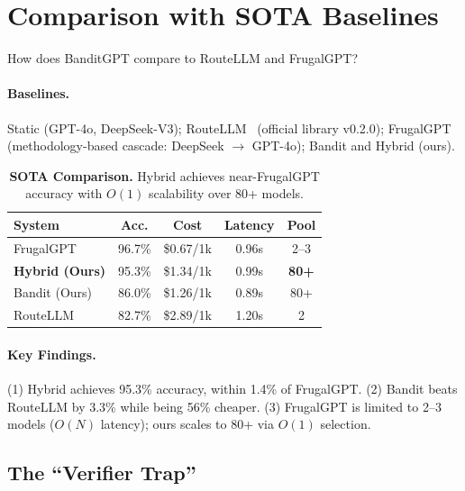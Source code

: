 
\section{Comparison with SOTA Baselines}
\label{sec:rq3_sota}

How does BanditGPT compare to RouteLLM and FrugalGPT?

\paragraph{Baselines.} Static (GPT-4o, DeepSeek-V3); RouteLLM~\cite{ong2024routellm} (official library v0.2.0); FrugalGPT~\cite{chen2023frugalgpt} (methodology-based cascade: DeepSeek $\to$ GPT-4o); Bandit and Hybrid (ours).

\begin{table}[t]
\centering
\small
\caption{\textbf{SOTA Comparison.} Hybrid achieves near-FrugalGPT accuracy with $O(1)$ scalability over 80+ models.}
\label{tab:sota_comparison}
\begin{tabular}{lcccc}
\toprule
\textbf{System} & \textbf{Acc.} & \textbf{Cost} & \textbf{Latency} & \textbf{Pool} \\
\midrule
FrugalGPT & 96.7\% & \$0.67/1k & 0.96s & 2--3 \\
\textbf{Hybrid (Ours)} & 95.3\% & \$1.34/1k & 0.99s & \textbf{80+} \\
Bandit (Ours) & 86.0\% & \$1.26/1k & 0.89s & 80+ \\
RouteLLM & 82.7\% & \$2.89/1k & 1.20s & 2 \\
\bottomrule
\end{tabular}
\end{table}

\paragraph{Key Findings.} (1) Hybrid achieves 95.3\% accuracy, within 1.4\% of FrugalGPT. (2) Bandit beats RouteLLM by 3.3\% while being 56\% cheaper. (3) FrugalGPT is limited to 2--3 models ($O(N)$ latency); ours scales to 80+ via $O(1)$ selection.

\subsection{The ``Verifier Trap''}
\label{sec:confident_failure}

